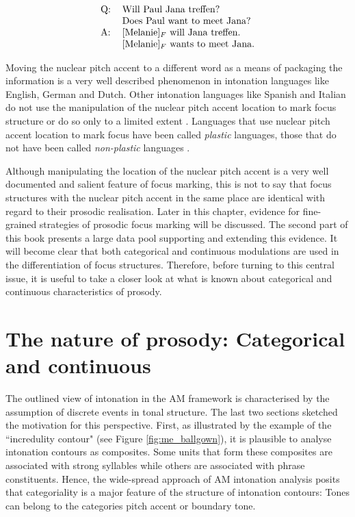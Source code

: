 \begin{equation}
\begin{tabular}{ll}
Q: & 	Will Paul Jana treffen?\\
&	Does Paul want to meet Jana?\\
A: &	[Melanie]$_F$ will Jana treffen.\\
&	[Melanie]$_F$ wants to meet Jana.
\end{tabular}
\label{ex:background}
\end{equation}

Moving the nuclear pitch accent to a different word as a means of packaging the information is a very well described phenomenon in intonation languages like English, German and Dutch. Other intonation languages like Spanish and Italian do not use the manipulation of the nuclear pitch accent location to mark focus structure or do so only to a limited extent \citep{Ladd2008}. Languages that use nuclear pitch accent location to mark focus have been called \emph{plastic} languages, those that do not have been called \emph{non-plastic} languages \citep{Vallduvi1991}.

Although manipulating the location of the nuclear pitch accent is a very well documented and salient feature of focus marking, this is not to say that focus structures with the nuclear pitch accent in the same place are identical with regard to their prosodic realisation. Later in this chapter, evidence for fine-grained strategies of prosodic focus marking will be discussed. The second part of this book presents a large data pool supporting and extending this evidence. It will become clear that both categorical and continuous modulations are used in the differentiation of focus structures. Therefore, before turning to this central issue, it is useful to take a closer look at what is known about categorical and continuous characteristics of prosody. 

\section{The nature of prosody: Categorical and continuous}
\label{sec:prosody_catcont}

The outlined view of intonation in the AM framework is characterised by the assumption of discrete events in tonal structure. The last two sections sketched the motivation for this perspective. First, as illustrated by the example of the ``incredulity contour" (see Figure \ref{fig:me_ballgown}), it is plausible to analyse intonation contours as composites. Some units that form these composites are associated with strong syllables while others are associated with phrase constituents. Hence, the wide-spread approach of AM intonation analysis posits that categoriality is a major feature of the structure of intonation contours: Tones can belong to the categories pitch accent or boundary tone. 

